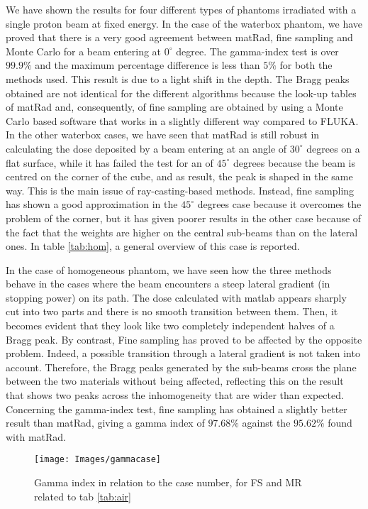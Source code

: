 \documentclass[12pt, a4paper, twoside]{book}
\begin{document}
We have shown the results for four different types of phantoms irradiated with a single proton beam at fixed energy.
In the case of the waterbox phantom, we have proved that there is a very good agreement between matRad, fine sampling and Monte Carlo for a beam entering at $0^\circ$ degree. The gamma-index test is over $99.9\%$ and the maximum percentage difference is less than $5\%$ for both the methods used. This result is due to a light shift in the depth.
The Bragg peaks obtained are not identical for the different algorithms because the look-up tables of matRad and, consequently, of fine sampling are obtained by using a Monte Carlo based software that works in a slightly different way compared to FLUKA.
In the other waterbox cases, we have seen that matRad is still robust in calculating the dose deposited by a beam entering at an angle of $30^\circ$ degrees on a flat surface, while it has failed the test for an  of $45^\circ$ degrees because the beam is centred on the corner of the cube, and as result, the peak is shaped in the same way. This is the main issue of ray-casting-based methods. Instead, fine sampling has shown a good approximation in the $45^\circ$ degrees case because it overcomes the problem of the corner, but it has given poorer results in the other case because of the fact that the weights are higher on the central sub-beams than on the lateral ones. In table \ref{tab:hom}, a general overview of this case is reported.

In the case of homogeneous phantom, we have seen how the three methods behave in the cases where the beam encounters a steep lateral gradient (in stopping power) on its path. The dose calculated with matlab appears sharply cut into two parts and there is no smooth transition between them. Then, it becomes evident that they look like two completely independent halves of a Bragg peak.
By contrast, Fine sampling has proved to be affected by the opposite problem. Indeed, a possible transition through a lateral gradient is not taken into account. Therefore, the Bragg peaks generated by the sub-beams cross the plane between the two materials without being affected, reflecting this on the result that shows two peaks across the inhomogeneity that are wider than expected. Concerning the gamma-index test, fine sampling has obtained a slightly better result than matRad, giving a gamma index of $97.68\%$ against the $95.62\%$ found with matRad.

\begin{figure}[!t]
\centering
{\texttt{[image: Images/gammacase]}} 
\caption{Gamma index in relation to the case number, for FS and MR related to tab \ref{tab:air}}
\label{fig:gamcase}
\end{figure}
\end{document}
